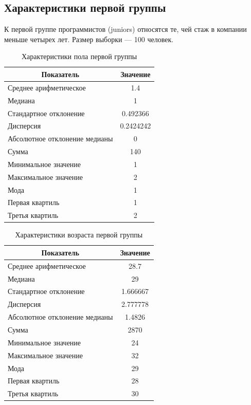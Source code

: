 \newpage

\subsection{Характеристики первой группы}
К первой группе программистов (juniors) относятся те, чей стаж в компании меньше четырех лет. Размер выборки --- 100 человек.

\begin{table}[H]
	\centering
	\caption{Характеристики пола первой группы}
	\begin{tabular}{|l|c|}
		\hline
		\multicolumn{1}{|c|}{\textbf{Показатель}} & \textbf{Значение}\\ \hline
		Среднее арифметическое        & 1.4       \\ \hline
		Медиана                       & 1         \\ \hline
		Стандартное отклонение        & 0.492366  \\ \hline
		Дисперсия                      & 0.2424242 \\ \hline
		Абсолютное отклонение медианы & 0         \\ \hline
		Сумма                         & 140       \\ \hline
		Минимальное значение          & 1         \\ \hline
		Максимальное значение         & 2         \\ \hline
		Мода & 1 \\ \hline
		Первая квартиль & 1 \\ \hline
		Третья квартиль & 2 \\ \hline
	\end{tabular}
\end{table}


\begin{table}[H]
	\centering
	\caption{Характеристики возраста первой группы}
	\begin{tabular}{|l|c|}
		\hline
		\multicolumn{1}{|c|}{\textbf{Показатель}} & \textbf{Значение}\\ \hline
		Среднее арифметическое        & 28.7     \\ \hline
		Медиана                       & 29       \\ \hline
		Стандартное отклонение        & 1.666667 \\ \hline
		Дисперсия                      & 2.777778 \\ \hline
		Абсолютное отклонение медианы & 1.4826   \\ \hline
		Сумма                         & 2870     \\ \hline
		Минимальное значение          & 24       \\ \hline
		Максимальное значение         & 32       \\ \hline
		Мода & 29 \\  \hline
		Первая квартиль & 28 \\ \hline
		Третья квартиль & 30 \\ \hline
	\end{tabular}
\end{table}


